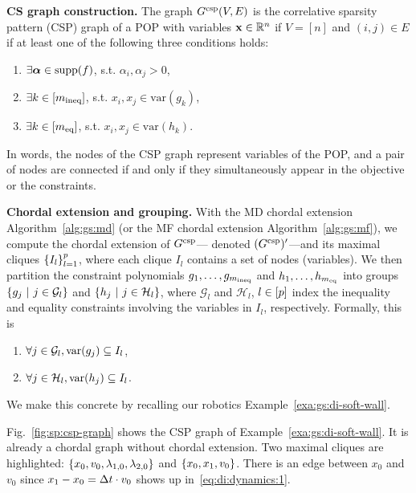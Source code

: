 
\textbf{CS graph construction.}  The graph $G^{\text{csp}}(V, E)$ is the correlative sparsity pattern (CSP) graph of a POP with variables $\mathbf{x} \in \mathbb{R}^n$ if $V = [n]$ and $(i, j) \in E$ if at least one of the following three conditions holds:
\begin{enumerate}
    \item $\exists \bm{\alpha} \in \text{supp}(f)$, s.t. $\alpha_i, \alpha_j > 0$,
    \item $\exists k \in [m_{\text{ineq}}]$, s.t. $x_i, x_j \in \text{var}(g_k)$,
    \item $\exists k \in [m_{\text{eq}}]$, s.t. $x_i, x_j \in \text{var}(h_k)$.
\end{enumerate}

In words, the nodes of the CSP graph represent variables of the POP, and a pair of nodes are connected if and only if they simultaneously appear in the objective or the constraints.

\textbf{Chordal extension and grouping.} With the MD chordal extension Algorithm~\ref{alg:gs:md} (or the MF chordal extension Algorithm~\ref{alg:gs:mf}), we compute the chordal extension of $G^{\text{csp}}$--- denoted $(G^{\text{csp}})'$---and its maximal cliques $\left\{I_l\right\}_{l=1}^{p}$, where each clique $I_l$ contains a set of nodes (variables). We then partition the constraint polynomials $g_1, \dots, g_{m_{\text{ineq}}}$ and $h_1, \dots, h_{m_{\text{eq}}}$ into groups $\left\{ g_j\ \middle\vert\  j\in {\cal G}_l \right\}$ and $\left\{ h_j\ \middle\vert\  j\in {\cal H}_l \right\}$, where $\mathcal{G}_l$ and $\mathcal{H}_l$, $l \in \left[ p \right]$ index the inequality and equality constraints involving the variables in $I_l$, respectively. Formally, this is 
\begin{enumerate}
    \item $\forall j \in {\cal G}_l, \text{var}(g_j)\subseteq I_l$, 
    \item $\forall j \in {\cal H}_l, \text{var}(h_j)\subseteq I_l$.
\end{enumerate}



We make this concrete by recalling our robotics Example~\ref{exa:gs:di-soft-wall}.

\begin{example}
	Fig.~\ref{fig:sp:csp-graph} shows the CSP graph of Example~\ref{exa:gs:di-soft-wall}. It is already a chordal graph without chordal extension. Two maximal cliques are highlighted: $\left\{x_0, v_0, \lambda_{1,0}, \lambda_{2,0}\right\}$ and $\left\{x_0, x_1, v_0\right\}$. There is an edge between $x_0$ and $v_0$ since $x_1 - x_0 = \Delta t \cdot v_0$ shows up in~\eqref{eq:di:dynamics:1}.
\end{example}


